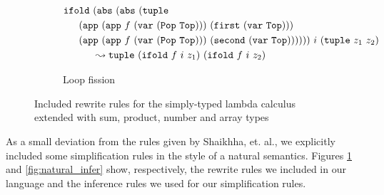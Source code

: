 \begin{figure}[]
\begin{subfigure}{1\textwidth}
    \begin{align*}
      \ifold{
        &(\abs{(\abs{
          (\tuple
          {\\&\hspace{-0.5cm}(\app{(\app{f}{(\var{(\Pop{\Top}))}})}
              {(\first{(\var{\Top})})})}
          {\\&\hspace{-0.5cm}(\app{(\app{f}{(\var{(\Pop{\Top}))}})}
              {(\second{(\var{\Top})})})})})})}
        {i}{(\tuple{z_1}{z_2})} \\
        & \leadsto \tuple{(\ifold{f}{i}{z_1})}{(\ifold{f}{i}{z_2})}
    \end{align*}
    \caption{Loop fission}
  \end{subfigure}
  \caption{Included rewrite rules for the simply-typed lambda calculus extended with sum, product, number and array types}
  \label{fig:rewrite_rules}
\end{figure}

As a small deviation from the rules given by Shaikhha, et. al.\cite{Shaikha2019}, we explicitly included some simplification rules in the style of a natural semantics. Figures \ref{fig:rewrite_rules} and \ref{fig:natural_infer} show, respectively, the rewrite rules we included in our language and the inference rules we used for our simplification rules.

